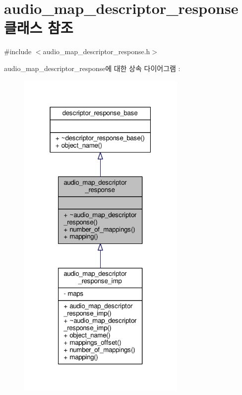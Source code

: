 \hypertarget{classavdecc__lib_1_1audio__map__descriptor__response}{}\section{audio\+\_\+map\+\_\+descriptor\+\_\+response 클래스 참조}
\label{classavdecc__lib_1_1audio__map__descriptor__response}


{\ttfamily \#include $<$audio\+\_\+map\+\_\+descriptor\+\_\+response.\+h$>$}



audio\+\_\+map\+\_\+descriptor\+\_\+response에 대한 상속 다이어그램 \+: 
\nopagebreak
\begin{figure}[H]
\begin{center}
\leavevmode
\includegraphics[width=232pt]{classavdecc__lib_1_1audio__map__descriptor__response__inherit__graph}
\end{center}
\end{figure}


